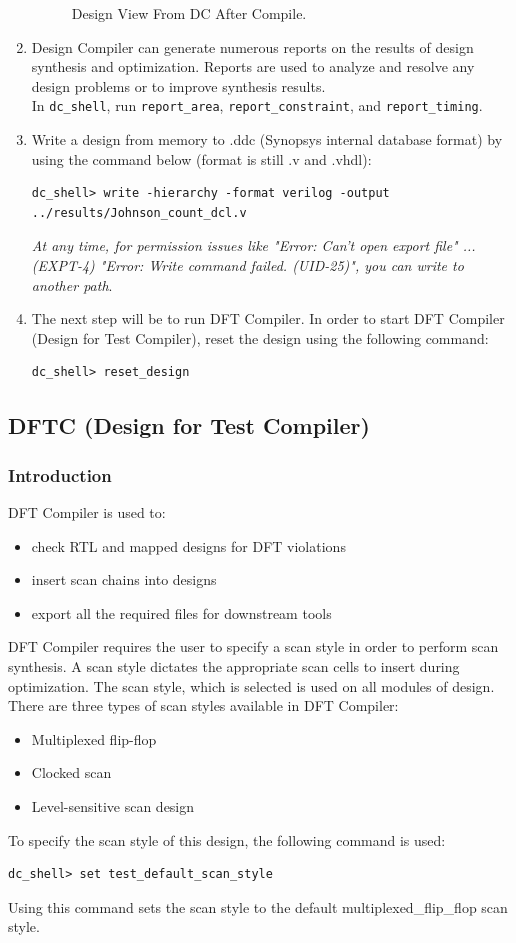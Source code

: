 \documentclass[a4paper,12pt,twoside]{article}
\begin{document}
\begin{enumerate}
\begin{figure}[H]
        \caption{Design View From DC After Compile.}
        \label{f23}
    \end{figure}
    \item Design Compiler can generate numerous reports on the results of design synthesis and optimization. Reports are used to analyze and resolve any design problems or to improve synthesis results.\\
    In \texttt{dc\_shell}, run \texttt{report\_area}, \texttt{report\_constraint}, and \texttt{report\_timing}.
    \item Write a design from memory to .ddc (Synopsys internal database format) by using the command below (format is still .v and .vhdl):
    \begin{verbatim}
dc_shell> write -hierarchy -format verilog -output ../results/Johnson_count_dcl.v
    \end{verbatim}
    \textit{At any time, for permission issues like "Error: Can't open export file" ... (EXPT-4) "Error: Write command failed. (UID-25)", you can write to another path}.
    \item The next step will be to run DFT Compiler. In order to start DFT Compiler (Design for Test Compiler), reset the design using the following command:
    \begin{verbatim}
dc_shell> reset_design
    \end{verbatim}
\end{enumerate}
\subsection{DFTC (Design for Test Compiler)}
\subsubsection{Introduction}
DFT Compiler is used to:
\begin{itemize}
    \item check RTL and mapped designs for DFT violations
    \item insert scan chains into designs
    \item export all the required files for downstream tools
\end{itemize}
DFT Compiler requires the user to specify a scan style in order to perform scan synthesis. A scan style dictates the appropriate scan cells to insert during optimization. The scan style, which is selected is used on all modules of design. There are three types of scan styles available in DFT Compiler:
\begin{itemize}
    \item Multiplexed flip-flop
    \item Clocked scan
    \item Level-sensitive scan design
\end{itemize}
To specify the scan style of this design, the following command is used:
\begin{verbatim}
dc_shell> set test_default_scan_style
\end{verbatim}
Using this command sets the scan style to the default multiplexed\_flip\_flop scan style.
\end{document}
